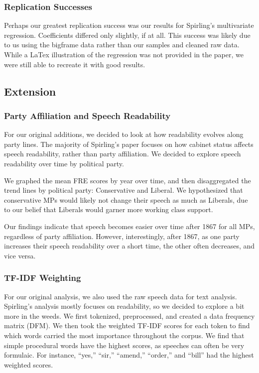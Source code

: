 \documentclass[
  letterpaper,
  DIV=11,
  numbers=noendperiod]{scrartcl}
\begin{document}
\subsubsection{Replication Successes}\label{replication-successes}

Perhaps our greatest replication success was our results for Spirling's
multivariate regression. Coefficients differed only slightly, if at all.
This success was likely due to us using the bigframe data rather than
our samples and cleaned raw data. While a LaTex illustration of the
regression was not provided in the paper, we were still able to recreate
it with good results.

\subsection{Extension}\label{extension}

\subsubsection{Party Affiliation and Speech
Readability}\label{party-affiliation-and-speech-readability}

For our original additions, we decided to look at how readability
evolves along party lines. The majority of Spirling's paper focuses on
how cabinet status affects speech readability, rather than party
affiliation. We decided to explore speech readability over time by
political party.

We graphed the mean FRE scores by year over time, and then disaggregated
the trend lines by political party: Conservative and Liberal. We
hypothesized that conservative MPs would likely not change their speech
as much as Liberals, due to our belief that Liberals would garner more
working class support.

Our findings indicate that speech becomes easier over time after 1867
for all MPs, regardless of party affiliation. However, interestingly,
after 1867, as one party increases their speech readability over a short
time, the other often decreases, and vice versa.

\subsubsection{TF-IDF Weighting}\label{tf-idf-weighting}

For our original analysis, we also used the raw speech data for text
analysis. Spirling's analysis mostly focuses on readability, so we
decided to explore a bit more in the weeds. We first tokenized,
preprocessed, and created a data frequency matrix (DFM). We then took
the weighted TF-IDF scores for each token to find which words carried
the most importance throughout the corpus. We find that simple
procedural words have the highest scores, as speeches can often be very
formulaic. For instance, ``yes,'' ``sir,'' ``amend,'' ``order,'' and
``bill'' had the highest weighted scores.
\end{document}
